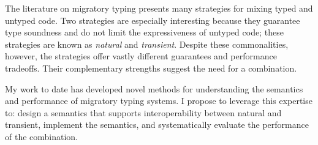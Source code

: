 The literature on migratory typing presents many strategies for
 mixing typed and untyped code.
Two strategies are especially interesting because they
 guarantee type soundness and do not limit the expressiveness of untyped code;
 these strategies are known as \emph{natural}\/ and \emph{transient}\/.
Despite these commonalities, however, the strategies offer vastly different
 guarantees and performance tradeoffs.
Their complementary strengths suggest the need for a combination.

My work to date has developed novel methods for understanding the semantics
 and performance of migratory typing systems.
I propose to leverage this expertise to: design a semantics that supports
 interoperability between natural and transient,
 implement the semantics,
 and systematically evaluate the performance of the combination.
